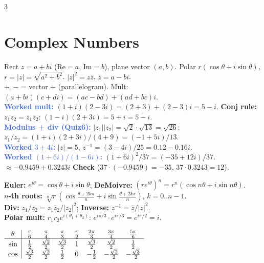 \documentclass[9pt]{extarticle}
\newcommand{\hl}[1]{\textbf{\textcolor{BrickRed}{#1}}}
\newcommand{\wk}[1]{\textbf{\textcolor{OliveGreen}{#1}}}
\newcommand{\ex}[1]{\textbf{\textcolor{RoyalBlue}{#1}}}
\begin{document}
\begin{multicols}{3}
\section{Complex Numbers}
\begin{sloppypar}\raggedright
Rect $z{=}a{+}bi$ (Re${=}a$, Im${=}b$), plane vector $(a,b)$. Polar $r(\cos\theta{+}i\sin\theta)$, $r{=}|z|{=}\sqrt{a^2{+}b^2}$. $|z|^2{=}z\bar z$, $\bar z{=}a{-}bi$.\\
$+,-$ = vector $+$ (parallelogram). Mult: $(a{+}bi)(c{+}di){=}(ac{-}bd){+}(ad{+}bc)i$.\\
\ex{Worked mult:} $(1{+}i)(2{-}3i){=}(2{+}3){+}(2{-}3)i{=}5{-}i$. \hl{Conj rule:} $\overline{z_1z_2}{=}\bar z_1\bar z_2$: $(1{-}i)(2{+}3i){=}5{+}i{=}\overline{5{-}i}$.\\
\ex{Modulus + div (Quiz6):} $|z_1||z_2|{=}\sqrt2{\cdot}\sqrt{13}{=}\sqrt{26}$; $z_1/z_2{=}(1{+}i)(2{+}3i)/(4{+}9){=}({-}1{+}5i)/13$.\\
\ex{Worked $3{+}4i$:} $|z|{=}5$, $z^{-1}{=}(3{-}4i)/25{=}0.12{-}0.16i$.\\
\ex{Worked $(1{+}6i)/(1{-}6i)$:} $(1{+}6i)^2/37{=}({-}35{+}12i)/37$.\\
${\approx}{-}0.9459{+}0.3243i$ \wk{Check} ($37{\cdot}({-}0.9459){=}{-}35$, $37{\cdot}0.3243{=}12$).\\
\end{sloppypar}
\begin{kbox}\raggedright
\textbf{Euler:} \hl{$e^{i\theta}{=}\cos\theta{+}i\sin\theta$}; \textbf{DeMoivre:} \hl{$(re^{i\theta})^n{=}r^n(\cos n\theta{+}i\sin n\theta)$}.\\
\textbf{$n$-th roots:} \hl{$\sqrt[n]{r}\left(\cos\frac{\theta{+}2k\pi}{n}{+}i\sin\frac{\theta{+}2k\pi}{n}\right)$}, $k{=}0..n{-}1$.\\
\textbf{Div:} \hl{$z_1/z_2{=}z_1\bar z_2/|z_2|^2$}; \textbf{Inverse:} \hl{$z^{-1}{=}\bar z/|z|^2$}.\\
\textbf{Polar mult:} \hl{$r_1r_2e^{i(\theta_1+\theta_2)}$}: $e^{i\pi/3}{\cdot}e^{i\pi/6}{=}e^{i\pi/2}{=}i$.
\end{kbox}
\begin{center}\scriptsize
${\renewcommand{\arraystretch}{0.9}\begin{array}{c|ccccccc}\theta&\frac\pi6&\frac\pi4&\frac\pi3&\frac\pi2&\frac{2\pi}3&\frac{3\pi}4&\frac{5\pi}6\\\hline\sin&\frac12&\frac{\sqrt2}2&\frac{\sqrt3}2&1&\frac{\sqrt3}2&\frac{\sqrt2}2&\frac12\\\cos&\frac{\sqrt3}2&\frac{\sqrt2}2&\frac12&0&{-}\frac12&{-}\frac{\sqrt2}2&{-}\frac{\sqrt3}2\end{array}}$

\end{center}
\end{multicols}
\end{document}
